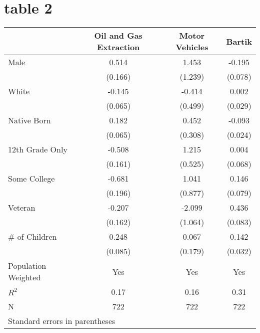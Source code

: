 \documentclass{article}
\begin{document}
\section{table 2}
\begin{tabular}{l*{3}{c}}
\toprule
                &\multicolumn{1}{c}{Oil and Gas Extraction}&\multicolumn{1}{c}{Motor Vehicles}&\multicolumn{1}{c}{Bartik}\\
\midrule
Male            &    0.514&    1.453&   -0.195\\
                &  (0.166)&  (1.239)&  (0.078)\\
White           &   -0.145&   -0.414&    0.002\\
                &  (0.065)&  (0.499)&  (0.029)\\
Native Born     &    0.182&    0.452&   -0.093\\
                &  (0.065)&  (0.308)&  (0.024)\\
12th Grade Only &   -0.508&    1.215&    0.004\\
                &  (0.161)&  (0.525)&  (0.068)\\
Some College    &   -0.681&    1.041&    0.146\\
                &  (0.196)&  (0.877)&  (0.079)\\
Veteran         &   -0.207&   -2.099&    0.436\\
                &  (0.162)&  (1.064)&  (0.083)\\
\# of Children  &    0.248&    0.067&    0.142\\
                &  (0.085)&  (0.179)&  (0.032)\\
\midrule
Population Weighted&      Yes&      Yes&      Yes\\
$ R^2$          &     0.17&     0.16&     0.31\\
N               &      722&      722&      722\\
\bottomrule
\multicolumn{4}{l}{\footnotesize Standard errors in parentheses}\\
\end{tabular}
\end{document}
